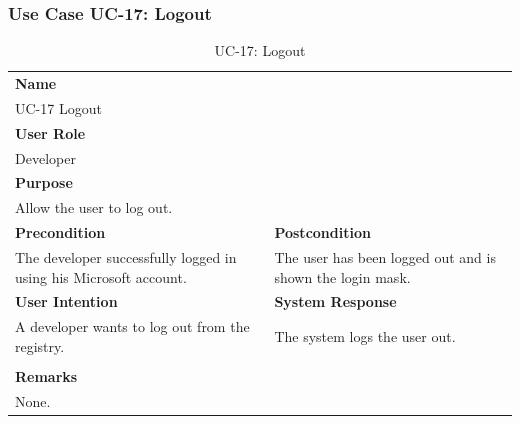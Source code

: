 \subsubsection{Use Case UC-17: Logout}\label{subsubsec:use-case-uc-17:-logout}

\begin{table}[H]
    \centering
    \begin{tabular}{|p{}|p{}|}

        \hline
        \multicolumn{2}{|l|}{\rowcolor{gray!50}\textbf{Name}} \\
        \multicolumn{2}{|l|}{UC-17 Logout} \\ \hline

        \multicolumn{2}{|l|}{\rowcolor{gray!50}\textbf{User Role}} \\
        \multicolumn{2}{|l|}{Developer} \\ \hline

        \multicolumn{2}{|l|}{\rowcolor{gray!50}\textbf{Purpose}} \\
        \multicolumn{2}{|l|}{Allow the user to log out.} \\ \hline

        \rowcolor{gray!50}\textbf{Precondition} & \rowcolor{gray!50}\textbf{Postcondition} \\
        The developer successfully logged in using his Microsoft account.
        &
        The user has been logged out and is shown the login mask.  \\ \hline

        \rowcolor{gray!50}\textbf{User Intention} & \rowcolor{gray!50}\textbf{System Response} \\
        A developer wants to log out from the registry.
        &
        The system logs the user out. \\ \hline

        & \\ \hline

        \multicolumn{2}{|l|}{\rowcolor{gray!50}\textbf{Remarks}} \\
        \multicolumn{2}{|p{1\textwidth}|}{None.} \\ \hline
    \end{tabular}
    \caption{UC-17: Logout}
    \label{tab:uc-logout}
\end{table}
